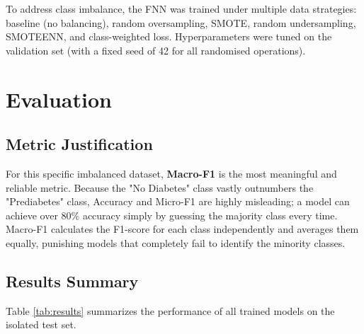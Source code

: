 \documentclass[12pt, a4paper]{article}
\begin{document}
To address class imbalance, the FNN was trained under multiple data strategies: baseline (no balancing), random oversampling, SMOTE, random undersampling, SMOTEENN, and class-weighted loss. Hyperparameters were tuned on the validation set (with a fixed seed of 42 for all randomised operations).

\section{Evaluation}

\subsection{Metric Justification}
For this specific imbalanced dataset, \textbf{Macro-F1} is the most meaningful and reliable metric. Because the "No Diabetes" class vastly outnumbers the "Prediabetes" class, Accuracy and Micro-F1 are highly misleading; a model can achieve over 80\% accuracy simply by guessing the majority class every time. Macro-F1 calculates the F1-score for each class independently and averages them equally, punishing models that completely fail to identify the minority classes.

\subsection{Results Summary}
Table \ref{tab:results} summarizes the performance of all trained models on the isolated test set.
\end{document}
